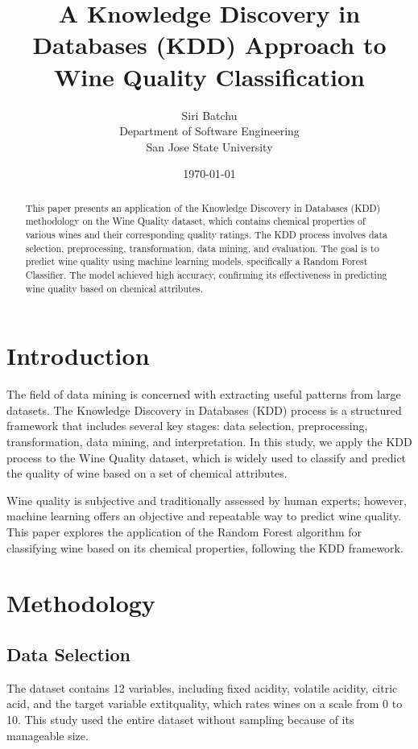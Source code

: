 \documentclass{article}
\title{A Knowledge Discovery in Databases (KDD) Approach to Wine Quality Classification}
\author{ Siri Batchu \\ Department of Software Engineering \\ San Jose State University}
\date{\today}
\begin{document}
\maketitle

\begin{abstract}
This paper presents an application of the Knowledge Discovery in Databases (KDD) methodology on the Wine Quality dataset, which contains chemical properties of various wines and their corresponding quality ratings. The KDD process involves data selection, preprocessing, transformation, data mining, and evaluation. The goal is to predict wine quality using machine learning models, specifically a Random Forest Classifier. The model achieved high accuracy, confirming its effectiveness in predicting wine quality based on chemical attributes.
\end{abstract}

\section{Introduction}
The field of data mining is concerned with extracting useful patterns from large datasets. The Knowledge Discovery in Databases (KDD) process is a structured framework that includes several key stages: data selection, preprocessing, transformation, data mining, and interpretation. In this study, we apply the KDD process to the Wine Quality dataset, which is widely used to classify and predict the quality of wine based on a set of chemical attributes.

Wine quality is subjective and traditionally assessed by human experts; however, machine learning offers an objective and repeatable way to predict wine quality. This paper explores the application of the Random Forest algorithm for classifying wine based on its chemical properties, following the KDD framework.

\section{Methodology}

\subsection{Data Selection}
The dataset contains 12 variables, including fixed acidity, volatile acidity, citric acid, and the target variable 	extit{quality}, which rates wines on a scale from 0 to 10. This study used the entire dataset without sampling because of its manageable size.
\end{document}
